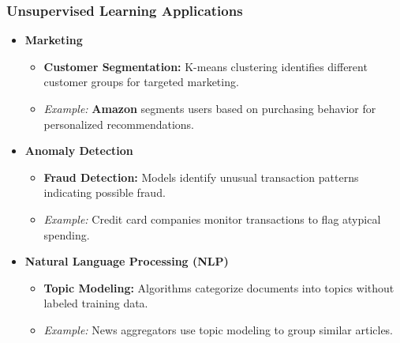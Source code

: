 \documentclass[aspectratio=169]{beamer}
\begin{document}
\begin{frame}[fragile]
    \frametitle{Unsupervised Learning Applications}
    \begin{itemize}
        \item \textbf{Marketing}
        \begin{itemize}
            \item \textbf{Customer Segmentation:} K-means clustering identifies different customer groups for targeted marketing.
            \item \textit{Example:} \textbf{Amazon} segments users based on purchasing behavior for personalized recommendations.
        \end{itemize}

        \item \textbf{Anomaly Detection}
        \begin{itemize}
            \item \textbf{Fraud Detection:} Models identify unusual transaction patterns indicating possible fraud.
            \item \textit{Example:} Credit card companies monitor transactions to flag atypical spending.
        \end{itemize}

        \item \textbf{Natural Language Processing (NLP)}
        \begin{itemize}
            \item \textbf{Topic Modeling:} Algorithms categorize documents into topics without labeled training data.
            \item \textit{Example:} News aggregators use topic modeling to group similar articles.
        \end{itemize}
    \end{itemize}
\end{frame}
\end{document}
